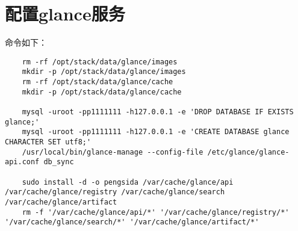 \documentclass[a4paper,left=1.5cm,right=1.5cm,11pt]{article}
\begin{document}
\section{配置glance服务}
	命令如下：
	\begin{lstlisting}
	rm -rf /opt/stack/data/glance/images
	mkdir -p /opt/stack/data/glance/images
	rm -rf /opt/stack/data/glance/cache
	mkdir -p /opt/stack/data/glance/cache

	mysql -uroot -pp1111111 -h127.0.0.1 -e 'DROP DATABASE IF EXISTS glance;'
	mysql -uroot -pp1111111 -h127.0.0.1 -e 'CREATE DATABASE glance CHARACTER SET utf8;'
	/usr/local/bin/glance-manage --config-file /etc/glance/glance-api.conf db_sync

	sudo install -d -o pengsida /var/cache/glance/api /var/cache/glance/registry /var/cache/glance/search /var/cache/glance/artifact
	rm -f '/var/cache/glance/api/*' '/var/cache/glance/registry/*' '/var/cache/glance/search/*' '/var/cache/glance/artifact/*'
	\end{lstlisting}
\end{document}
